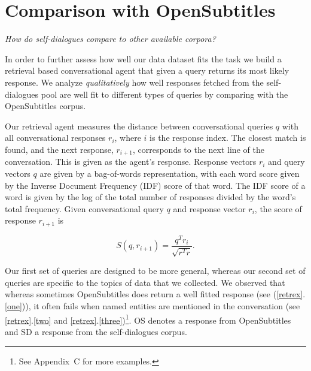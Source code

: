 \documentclass[11pt,a4paper]{article}
\begin{document}
\section{Comparison with OpenSubtitles}\label{sec:experiments}

\textit{How do self-dialogues compare to other available corpora?}

In order to further assess how well our data dataset fits the task we build a retrieval based conversational agent that given a query returns its most likely response. We analyze \textit{qualitatively} how well responses fetched from the self-dialogues pool are well fit to different types of queries by comparing with the OpenSubtitles corpus.

Our retrieval agent measures the distance between conversational queries $q$ with all conversational responses $r_i$, where $i$ is the response index. The closest match is found, and the next response, $r_{i+1}$, corresponds to the next line of the conversation. This is given as the agent's response. Response vectors $r_i$ and query vectors $q$ are given by a bag-of-words representation, with each word score given by the Inverse Document Frequency (IDF) score of that word. The IDF score of a word is given by the log of the total number of responses divided by the word's total frequency. Given conversational query $q$ and response vector $r_i$, the score of response $r_{i+1}$ is

\begin{equation}
    S(q,r_{i+1}) = \frac{{q^T r_i}}{\sqrt{r^T r}}.	
\end{equation}

Our first set of queries are designed to be more general, whereas our second set of queries are specific to the topics of data that we collected. We observed that whereas sometimes OpenSubtitles does return a well fitted response (see (\ref{retrex}.\ref{one})), it often fails when named entities are mentioned in the conversation (see \ref{retrex}.\ref{two} and \ref{retrex}.\ref{three})\footnote{See Appendix~C for more examples.}. OS denotes a response from OpenSubtitles and SD a response from the self-dialogues corpus.

\end{document}
